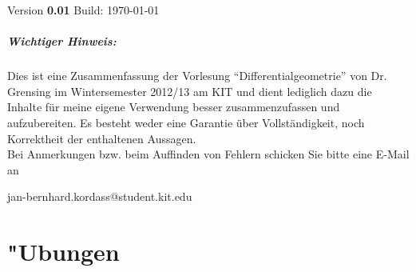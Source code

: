 \documentclass[a4paper, twoside, 11pt]{scrbook}
\begin{document}

\vspace{0.5cm}

Version \textbf{0.01} \quad Build: \today

\paragraph{Wichtiger Hinweis:}
Dies ist eine Zusammenfassung der Vorlesung "`Differentialgeometrie"' von Dr. Grensing im Wintersemester 2012/13 am KIT und dient lediglich dazu die Inhalte für meine eigene Verwendung besser zusammenzufassen und aufzubereiten. Es besteht weder eine Garantie über Vollständigkeit, noch Korrektheit der enthaltenen Aussagen.\\

Bei Anmerkungen bzw. beim Auffinden von Fehlern schicken Sie bitte eine E-Mail an
\begin{center}
  jan-bernhard.kordass@student.kit.edu
\end{center}









\appendix


\chapter{"Ubungen}

\renewcommand*{\othersectionlevelsformat}[3]{\ifstr{#1}{section}{\"Ubung\ #3\ vom\ }{#3\autodot\enskip}}


\setcounter{section}{-1}





\printindex


\printglossaries

\end{document}
